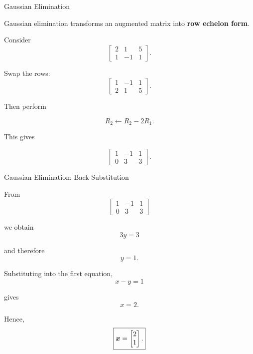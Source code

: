 
\begin{frame}{Gaussian Elimination}

Gaussian elimination transforms an augmented matrix into
\textbf{row echelon form}.

Consider
\vspace{-0.1cm}
\[
\left[
\begin{array}{cc|c}
2&1&5\\
1&-1&1
\end{array}
\right].
\]

Swap the rows:
\vspace{-0.1cm}
\[
\left[
\begin{array}{cc|c}
1&-1&1\\
2&1&5
\end{array}
\right].
\]

Then perform

\[
R_2\leftarrow R_2-2R_1.
\]

This gives

\[
\left[
\begin{array}{cc|c}
1&-1&1\\
0&3&3
\end{array}
\right].
\]

\end{frame}



\begin{frame}{Gaussian Elimination: Back Substitution}

From
\vspace{-0.1cm}
\[
\left[
\begin{array}{cc|c}
1&-1&1\\
0&3&3
\end{array}
\right]
\]

we obtain
\vspace{-0.1cm}
\[
3y=3
\]

and therefore
\vspace{-0.1cm}
\[
y=1.
\]

Substituting into the first equation,
\vspace{-0.2cm}
\[
x-y=1
\]

gives
\vspace{-0.2cm}
\[
x=2.
\]

Hence,
\vspace{-0.2cm}
\[
\boxed{
\bm{x}
=
\begin{bmatrix}
2\\
1
\end{bmatrix}.
}
\]

\end{frame}


